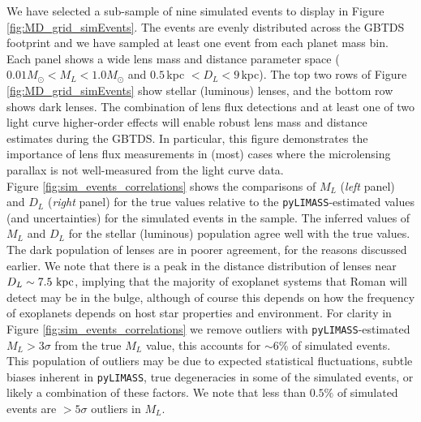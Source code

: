\documentclass[twocolumn]{aastex631}
\begin{document}
\indent We have selected a sub-sample of nine simulated events to display in Figure \ref{fig:MD_grid_simEvents}. The events are evenly distributed across the GBTDS footprint and we have sampled at least one event from each planet mass bin. Each panel shows a wide lens mass and distance parameter space ($0.01M_{\odot} < M_L < 1.0M_{\odot}$ and $0.5$\,kpc $< D_L < 9$\,kpc). The top two rows of Figure \ref{fig:MD_grid_simEvents} show stellar (luminous) lenses, and the bottom row shows dark lenses. The combination of lens flux detections and at least one of two light curve higher-order effects will enable robust lens mass and distance estimates during the GBTDS. In particular, this figure demonstrates the importance of lens flux measurements in (most) cases where the microlensing parallax is not well-measured from the light curve data. \\
\indent Figure \ref{fig:sim_events_correlations} shows the comparisons of $M_L$ (\textit{left} panel) and $D_L$ (\textit{right} panel) for the true values relative to the \texttt{pyLIMASS}-estimated values (and uncertainties) for the simulated events in the sample. The inferred values of $M_L$ and $D_L$ for the stellar (luminous) population agree well with the true values. The dark population of lenses are in poorer agreement, for the reasons discussed earlier. We note that there is a peak in the distance distribution of lenses near $D_L \sim 7.5~{\rm kpc}$, implying that the majority of exoplanet systems that Roman will detect may be in the bulge, although of course this depends on how the frequency of exoplanets depends on host star properties and environment. For clarity in Figure \ref{fig:sim_events_correlations} we remove outliers with \texttt{pyLIMASS}-estimated $M_L > 3\sigma$ from the true $M_L$ value, this accounts for ${\sim}6$\% of simulated events. This population of outliers may be due to expected statistical fluctuations, subtle biases inherent in \texttt{pyLIMASS}, true degeneracies in some of the simulated events, or likely a combination of these factors. We note that less than $0.5\%$ of simulated events are $> 5\sigma$ outliers in $M_L$. \\
\end{document}
